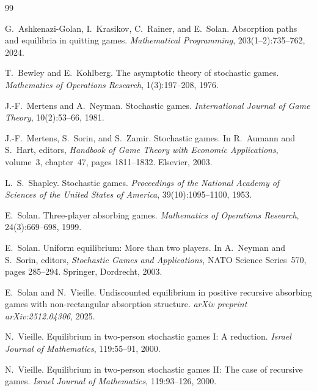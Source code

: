 \documentclass[12pt]{article}
\theoremstyle{definition}
\newcommand{\1}{\mathbf{1}}
\begin{document}
\begin{thebibliography}{99}

G.~Ashkenazi-Golan, I.~Krasikov, C.~Rainer, and E.~Solan.
\newblock Absorption paths and equilibria in quitting games.
\newblock \emph{Mathematical Programming}, 203(1--2):735--762, 2024.

T.~Bewley and E.~Kohlberg.
\newblock The asymptotic theory of stochastic games.
\newblock \emph{Mathematics of Operations Research}, 1(3):197--208, 1976.

J.-F.~Mertens and A.~Neyman.
\newblock Stochastic games.
\newblock \emph{International Journal of Game Theory}, 10(2):53--66, 1981.

J.-F.~Mertens, S.~Sorin, and S.~Zamir.
\newblock Stochastic games.
\newblock In R.~Aumann and S.~Hart, editors, \emph{Handbook of Game Theory with
Economic Applications}, volume~3, chapter~47, pages 1811--1832. Elsevier, 2003.

L.~S.~Shapley.
\newblock Stochastic games.
\newblock \emph{Proceedings of the National Academy of Sciences of the United States of
America}, 39(10):1095--1100, 1953.

E.~Solan.
\newblock Three-player absorbing games.
\newblock \emph{Mathematics of Operations Research}, 24(3):669--698, 1999.

E.~Solan.
\newblock Uniform equilibrium: More than two players.
\newblock In A.~Neyman and S.~Sorin, editors, \emph{Stochastic Games and Applications},
NATO Science Series~570, pages 285--294. Springer, Dordrecht, 2003.

E.~Solan and N.~Vieille.
\newblock Undiscounted equilibrium in positive recursive absorbing games with
non-rectangular absorption structure.
\newblock \emph{arXiv preprint arXiv:2512.04306}, 2025.

N.~Vieille.
\newblock Equilibrium in two-person stochastic games {I}: A reduction.
\newblock \emph{Israel Journal of Mathematics}, 119:55--91, 2000.

N.~Vieille.
\newblock Equilibrium in two-person stochastic games {II}: The case of recursive games.
\newblock \emph{Israel Journal of Mathematics}, 119:93--126, 2000.

\end{thebibliography}
\end{document}
